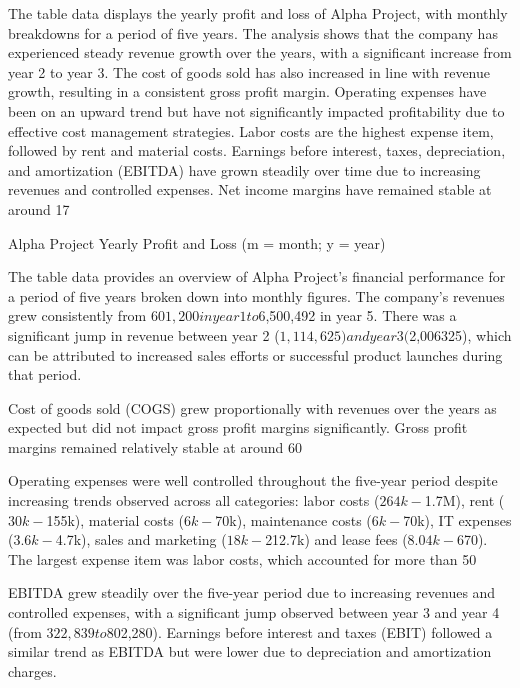 
The table data displays the yearly profit and loss of Alpha Project, with monthly breakdowns for a period of five years. The analysis shows that the company has experienced steady revenue growth over the years, with a significant increase from year 2 to year 3. The cost of goods sold has also increased in line with revenue growth, resulting in a consistent gross profit margin. Operating expenses have been on an upward trend but have not significantly impacted profitability due to effective cost management strategies. Labor costs are the highest expense item, followed by rent and material costs. Earnings before interest, taxes, depreciation, and amortization (EBITDA) have grown steadily over time due to increasing revenues and controlled expenses. Net income margins have remained stable at around 17%

Alpha Project Yearly Profit and Loss (m = month; y = year)

The table data provides an overview of Alpha Project's financial performance for a period of five years broken down into monthly figures. The company's revenues grew consistently from $601,200 in year 1 to $6,500,492 in year 5. There was a significant jump in revenue between year 2 ($1,114,625) and year 3 ($2,006325), which can be attributed to increased sales efforts or successful product launches during that period.

Cost of goods sold (COGS) grew proportionally with revenues over the years as expected but did not impact gross profit margins significantly. Gross profit margins remained relatively stable at around 60%

Operating expenses were well controlled throughout the five-year period despite increasing trends observed across all categories: labor costs ($264k - $1.7M), rent ($30k - $155k), material costs ($6k - $70k), maintenance costs ($6k - $70k), IT expenses ($3.6k - $4.7k), sales and marketing ($18k - $212.7k) and lease fees ($8.04k - $670). The largest expense item was labor costs, which accounted for more than 50%

EBITDA grew steadily over the five-year period due to increasing revenues and controlled expenses, with a significant jump observed between year 3 and year 4 (from $322,839 to $802,280). Earnings before interest and taxes (EBIT) followed a similar trend as EBITDA but were lower due to depreciation and amortization charges.

